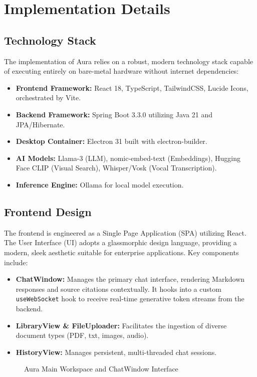 \section{Implementation Details}

\subsection{Technology Stack}
The implementation of Aura relies on a robust, modern technology stack capable of executing entirely on bare-metal hardware without internet dependencies:
\begin{itemize}
    \item \textbf{Frontend Framework:} React 18, TypeScript, TailwindCSS, Lucide Icons, orchestrated by Vite.
    \item \textbf{Backend Framework:} Spring Boot 3.3.0 utilizing Java 21 and JPA/Hibernate.
    \item \textbf{Desktop Container:} Electron 31 built with electron-builder.
    \item \textbf{AI Models:} Llama-3 (LLM), nomic-embed-text (Embeddings), Hugging Face CLIP (Visual Search), Whisper/Vosk (Vocal Transcription).
    \item \textbf{Inference Engine:} Ollama for local model execution.
\end{itemize}

\subsection{Frontend Design}
The frontend is engineered as a Single Page Application (SPA) utilizing React. The User Interface (UI) adopts a glassmorphic design language, providing a modern, sleek aesthetic suitable for enterprise applications. Key components include:
\begin{itemize}
    \item \textbf{ChatWindow:} Manages the primary chat interface, rendering Markdown responses and source citations contextually. It hooks into a custom \texttt{useWebSocket} hook to receive real-time generative token streams from the backend.
    \item \textbf{LibraryView \& FileUploader:} Facilitates the ingestion of diverse document types (PDF, txt, images, audio).
    \item \textbf{HistoryView:} Manages persistent, multi-threaded chat sessions.
\end{itemize}
\begin{figure}[htbp]
\centering
{}
\caption{Aura Main Workspace and ChatWindow Interface}
\label{fig:chat_ui}
\end{figure}

